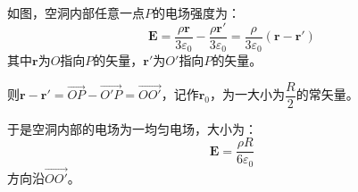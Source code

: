 \documentclass[a4paper,fontset=none]{ctexart}
\begin{document}
\begin{itemize}
        如图，空洞内部任意一点$P$的电场强度为：
        \[
            \bm{E} = \frac{\rho\bm{r}}{3\varepsilon_0} - \frac{\rho\bm{r}'}{3\varepsilon_0} = \frac{\rho}{3\varepsilon_0}(\bm{r}-\bm{r}')
        \]
        其中$\bm{r}$为$O$指向$P$的矢量，$\bm{r}'$为$O'$指向$P$的矢量。

        则$\bm{r}-\bm{r}'=\overrightarrow{OP}-\overrightarrow{O'P}=\overrightarrow{OO'}$，记作$\bm{r}_0$，为一大小为$\dfrac{R}{2}$的常矢量。

        于是空洞内部的电场为一均匀电场，大小为：
        \[
            \bm{E} = \frac{\rho R}{6\varepsilon_0}
        \]
        方向沿$\overrightarrow{OO'}$。

    \end{itemize}
\end{document}
